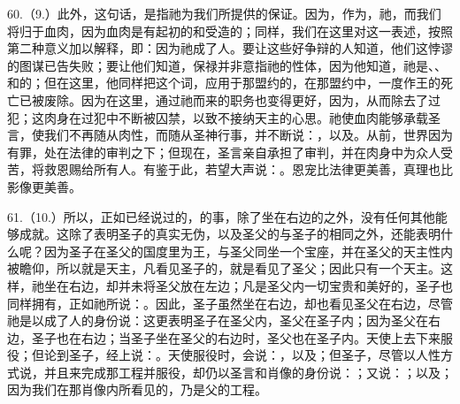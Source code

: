 60.（9.）此外，这句话，是指祂为我们所提供的保证。因为，作为，祂，而我们将归于血肉，因为血肉是有起初的和受造的；同样，我们在这里对这一表述，按照第二种意义加以解释，即：因为祂成了人。要让这些好争辩的人知道，他们这悖谬的图谋已告失败；要让他们知道，保禄并非意指祂的性体，因为他知道，祂是、、和的；但在这里，他同样把这个词，应用于那盟约的，在那盟约中，一度作王的死亡已被废除。因为在这里，通过祂而来的职务也变得更好，因为，从而除去了过犯；这肉身在过犯中不断被囚禁，以致不接纳天主的心思。祂使血肉能够承载圣言，使我们不再随从肉性，而随从圣神行事，并不断说：，以及。从前，世界因为有罪，处在法律的审判之下；但现在，圣言亲自承担了审判，并在肉身中为众人受苦，将救恩赐给所有人。有鉴于此，若望大声说：。恩宠比法律更美善，真理也比影像更美善。\par

61.（10.）所以，正如已经说过的，的事，除了坐在右边的之外，没有任何其他能够成就。这除了表明圣子的真实无伪，以及圣父的与圣子的相同之外，还能表明什么呢？因为圣子在圣父的国度里为王，与圣父同坐一个宝座，并在圣父的天主性内被瞻仰，所以就是天主，凡看见圣子的，就是看见了圣父；因此只有一个天主。这样，祂坐在右边，却并未将圣父放在左边；凡是圣父内一切宝贵和美好的，圣子也同样拥有，正如祂所说：。因此，圣子虽然坐在右边，却也看见圣父在右边，尽管祂是以成了人的身份说：这更表明圣子在圣父内，圣父在圣子内；因为圣父在右边，圣子也在右边；当圣子坐在圣父的右边时，圣父也在圣子内。天使上去下来服役；但论到圣子，经上说：。天使服役时，会说：，以及；但圣子，尽管以人性方式说，并且来完成那工程并服役，却仍以圣言和肖像的身份说：；又说：；以及；因为我们在那肖像内所看见的，乃是父的工程。\par

